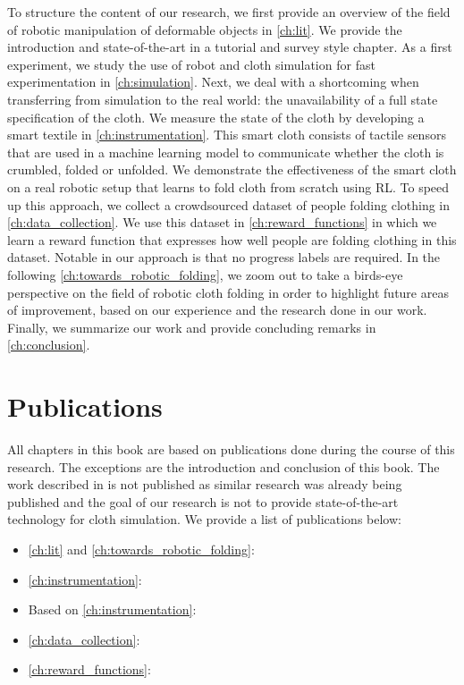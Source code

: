 \documentclass[\home/main.tex]{subfiles}
\begin{document}
To structure the content of our research, we first provide an overview of the field of robotic manipulation of deformable objects in \cref{ch:lit}. We provide the introduction and state-of-the-art in a tutorial and survey style chapter. As a first experiment, we study the use of robot and cloth simulation for fast experimentation in \cref{ch:simulation}. Next, we deal with a shortcoming when transferring from simulation to the real world: the unavailability of a full state specification of the cloth. We measure the state of the cloth by developing a smart textile in \cref{ch:instrumentation}. This smart cloth consists of tactile sensors that are used in a machine learning model to communicate whether the cloth is crumbled, folded or unfolded. We demonstrate the effectiveness of the smart cloth on a real robotic setup that learns to fold cloth from scratch using RL. To speed up this approach, we collect a crowdsourced dataset of people folding clothing in \cref{ch:data_collection}. We use this dataset in \cref{ch:reward_functions} in which we learn a reward function that expresses how well people are folding clothing in this dataset. Notable in our approach is that no progress labels are required.
In the following \cref{ch:towards_robotic_folding}, we zoom out to take a birds-eye perspective on the field of robotic cloth folding in order to highlight future areas of improvement, based on our experience and the research done in our work.
Finally, we summarize our work and provide concluding remarks in \cref{ch:conclusion}.

\section{Publications}
All chapters in this book are based on publications done during the course of this research. The exceptions are the introduction and conclusion of this book. The work described in  is not published as similar research was already being published and the goal of our research is not to provide state-of-the-art technology for cloth simulation. We provide a list of publications below:
\begin{itemize}
    \item \cref{ch:lit} and \cref{ch:towards_robotic_folding}:
    \item \cref{ch:instrumentation}: 
    \item Based on \cref{ch:instrumentation}: 
    \item \cref{ch:data_collection}: 
    \item \cref{ch:reward_functions}: 
\end{itemize}
\end{document}
